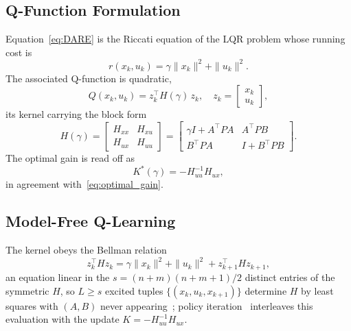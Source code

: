 \documentclass[final,5p,times,authoryear]{elsarticle}
\theoremstyle{plain}
\theoremstyle{definition}
\theoremstyle{remark}
\begin{document}
\subsection{Q-Function Formulation}

Equation~\eqref{eq:DARE} is the Riccati equation of the LQR problem
whose running cost is
\begin{equation}
r(x_k, u_k) = \gamma \|x_k\|^2 + \|u_k\|^2.
\label{eq:stage_cost}
\end{equation}
The associated Q-function is quadratic,
\begin{equation}
Q(x_k, u_k) = z_k^\top H(\gamma)\, z_k,
\quad z_k = \begin{bmatrix} x_k \\ u_k \end{bmatrix},
\label{eq:Q_function}
\end{equation}
its kernel carrying the block form
\begin{equation}
H(\gamma)
  = \begin{bmatrix} H_{xx} & H_{xu} \\ H_{ux} & H_{uu} \end{bmatrix}
  = \begin{bmatrix}
        \gamma I + A^\top\! PA & A^\top\! PB \\
        B^\top\! PA            & I + B^\top\! PB
    \end{bmatrix}.
\label{eq:H_matrix}
\end{equation}
The optimal gain is read off as
\begin{equation}
K^*(\gamma) = -H_{uu}^{-1} H_{ux},
\label{eq:K_from_H}
\end{equation}
in agreement with~\eqref{eq:optimal_gain}.

\subsection{Model-Free Q-Learning}\label{sec:qlearning}

The kernel obeys the Bellman relation
\begin{equation}
z_k^\top H z_k = \gamma\|x_k\|^2 + \|u_k\|^2 + z_{k+1}^\top H z_{k+1},
\label{eq:Bellman}
\end{equation}
an equation linear in the $s = (n{+}m)(n{+}m{+}1)/2$ distinct entries
of the symmetric $H$, so $L \geq s$ excited tuples
$\{(x_k, u_k, x_{k+1})\}$ determine $H$ by least squares with $(A,B)$
never appearing~\citep{RizviLin2018CDC,RizviLin2023book}; policy
iteration~\citep{Kleinman1968} interleaves this evaluation with the
update $K = -H_{uu}^{-1}H_{ux}$.
\end{document}
